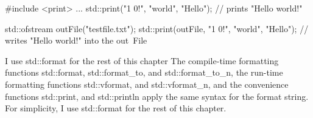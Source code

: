 \begin{cpp}
#include <print>
...
std::print("{1} {0}!", "world", "Hello"); // prints "Hello world!"

std::ofstream outFile("testfile.txt");
std::print(outFile, "{1} {0}!", "world", "Hello"); // writes "Hello world!" into the out\
File
\end{cpp}

\begin{myNotic}{I use std::format for the rest of this chapter}
The compile-time formatting functions std::format, std::format\_to, and std::format\_to\_n, the run-time formatting functions std::vformat, and std::vformat\_n, and the convenience functions std::print, and std::println apply the same syntax for the format string. For simplicity, I use std::format for the rest of this chapter.
\end{myNotic}
































